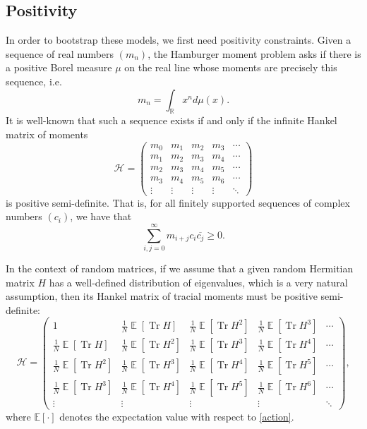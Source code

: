 \documentclass[10pt]{article}
\theoremstyle{plain}
\theoremstyle{definition}
\DeclareMathOperator{\tr}{Tr}
\DeclareMathOperator{\ex}{\mathbb{E}}
\theoremstyle{plain}
\begin{document}
\subsection{Positivity}
 In order to bootstrap these models, we first need positivity constraints.
Given a sequence of real numbers $(m_{n})$, the Hamburger moment problem asks if there is a positive Borel measure $\mu$ on the real line whose moments are precisely this sequence, i.e.
\begin{equation*}
 m_{n} = \int_{\mathbb{R}}x^{n}d\mu(x).
\end{equation*}
It is well-known that such a sequence exists if and only if the infinite Hankel matrix of moments
\[
\mathcal{H} =
\begin{pmatrix}
m_0 & m_1 & m_2 & m_3 & \cdots \\
m_1 & m_2 & m_3 & m_4 & \cdots \\
m_2 & m_3 & m_4 & m_5 & \cdots \\
m_3 & m_4 & m_5 & m_6 & \cdots \\
\vdots & \vdots & \vdots & \vdots & \ddots
\end{pmatrix}
\]
is positive semi-definite. That is, for all finitely supported sequences of complex numbers $(c_{i})$, we have that 
\begin{equation*}
 \sum_{i,j=0}^{\infty} m_{i+j}c_{i}\overline{c_{j}} \geq 0.
\end{equation*}

In the context of random matrices, if we assume that a given random Hermitian matrix $H$ has a well-defined distribution of eigenvalues, which is a very natural assumption, then its Hankel matrix of tracial moments must be positive semi-definite:
\[
\mathcal{H} =
\begin{pmatrix}
1 & 
\frac{1}{N}\ex[\tr H] & \frac{1}{N}\ex[\tr H^2]& \frac{1}{N}\ex[\tr H^3] & \cdots \\
\frac{1}{N}\ex[\tr H] & \frac{1}{N}\ex[\tr H^2] & \frac{1}{N}\ex[\tr H^3] & \frac{1}{N}\ex[\tr H^4]& \cdots \\
\frac{1}{N}\ex[\tr H^2] & \frac{1}{N}\ex[\tr H^3] & \frac{1}{N}\ex[\tr H^4] & \frac{1}{N}\ex[\tr H^5] & \cdots \\
\frac{1}{N}\ex[\tr H^3] & \frac{1}{N}\ex[\tr H^4] & \frac{1}{N}\ex[\tr H^5] & \frac{1}{N}\ex[\tr H^6] & \cdots \\
\vdots & \vdots & \vdots & \vdots & \ddots
\end{pmatrix},
\]
where $\mathbb{E}[\cdot]$ denotes the expectation value with respect to \eqref{action}.
\end{document}

